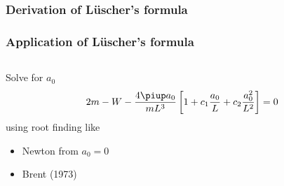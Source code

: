 \documentclass[english, fleqn]{beamer}
\begin{document}
\begin{frame}
    \frametitle{Derivation of Lüscher's formula}

\end{frame}

\begin{frame}
    \frametitle{Application of Lüscher's formula}
    \begin{columns}
        \begin{column}{0.6\textwidth}
                
            Solve for $a_0$
            \[
                2m - W - \frac{4 \piup a_0}{m L^3} \sbr{1 + c_1 \frac{a_0}L + c_2 \frac{a_0^2}{L^2}} = 0
            \]
            using root finding like
            \begin{itemize}
                \item
                    Newton from $a_0 = 0$
                \item
                    Brent (1973)
            \end{itemize}


\end{column}
\end{columns}
\end{frame}
\end{document}
